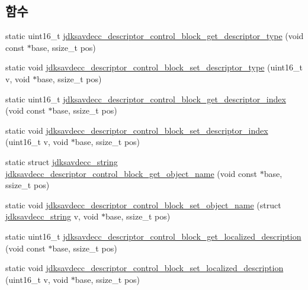 \subsection*{함수}
\begin{DoxyCompactItemize}
\item 
static uint16\+\_\+t \hyperlink{group__descriptor__control__block_ga6c0f9bca7a62b58b7a94a89e8d703807}{jdksavdecc\+\_\+descriptor\+\_\+control\+\_\+block\+\_\+get\+\_\+descriptor\+\_\+type} (void const $\ast$base, ssize\+\_\+t pos)
\item 
static void \hyperlink{group__descriptor__control__block_ga633ee6de1d02835338736f2e6b8ee5dd}{jdksavdecc\+\_\+descriptor\+\_\+control\+\_\+block\+\_\+set\+\_\+descriptor\+\_\+type} (uint16\+\_\+t v, void $\ast$base, ssize\+\_\+t pos)
\item 
static uint16\+\_\+t \hyperlink{group__descriptor__control__block_ga5f83c5755ec74b7051fe847c5fd2b467}{jdksavdecc\+\_\+descriptor\+\_\+control\+\_\+block\+\_\+get\+\_\+descriptor\+\_\+index} (void const $\ast$base, ssize\+\_\+t pos)
\item 
static void \hyperlink{group__descriptor__control__block_ga670094cb2f68cc54d49d04c395bfd89b}{jdksavdecc\+\_\+descriptor\+\_\+control\+\_\+block\+\_\+set\+\_\+descriptor\+\_\+index} (uint16\+\_\+t v, void $\ast$base, ssize\+\_\+t pos)
\item 
static struct \hyperlink{structjdksavdecc__string}{jdksavdecc\+\_\+string} \hyperlink{group__descriptor__control__block_ga55448f6f51919698a8711c3c8dc5016e}{jdksavdecc\+\_\+descriptor\+\_\+control\+\_\+block\+\_\+get\+\_\+object\+\_\+name} (void const $\ast$base, ssize\+\_\+t pos)
\item 
static void \hyperlink{group__descriptor__control__block_ga50d7c283c90b9225662e51b255c8e94a}{jdksavdecc\+\_\+descriptor\+\_\+control\+\_\+block\+\_\+set\+\_\+object\+\_\+name} (struct \hyperlink{structjdksavdecc__string}{jdksavdecc\+\_\+string} v, void $\ast$base, ssize\+\_\+t pos)
\item 
static uint16\+\_\+t \hyperlink{group__descriptor__control__block_gaf65a5fef222d0937b4eb892cbb498e4f}{jdksavdecc\+\_\+descriptor\+\_\+control\+\_\+block\+\_\+get\+\_\+localized\+\_\+description} (void const $\ast$base, ssize\+\_\+t pos)
\item 
static void \hyperlink{group__descriptor__control__block_ga95b9325d1e7addfc52709f622e01cb07}{jdksavdecc\+\_\+descriptor\+\_\+control\+\_\+block\+\_\+set\+\_\+localized\+\_\+description} (uint16\+\_\+t v, void $\ast$base, ssize\+\_\+t pos)
\item 

\end{DoxyCompactItemize}
